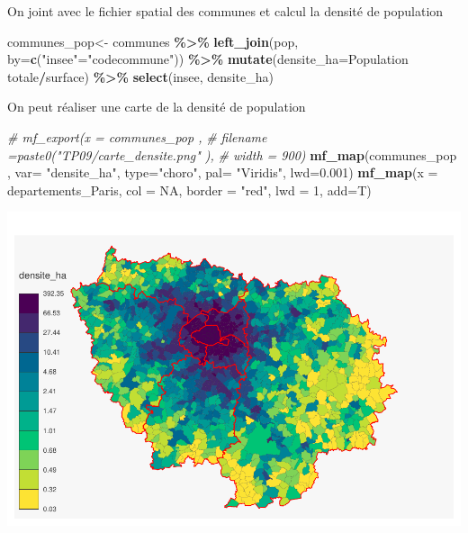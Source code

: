 \documentclass[
]{book}
\newenvironment{Shaded}{\begin{snugshade}}{\end{snugshade}}
\newcommand{\AttributeTok}[1]{\textcolor[rgb]{0.13,0.29,0.53}{#1}}
\newcommand{\CommentTok}[1]{\textcolor[rgb]{0.56,0.35,0.01}{\textit{#1}}}
\newcommand{\ConstantTok}[1]{\textcolor[rgb]{0.56,0.35,0.01}{#1}}
\newcommand{\DecValTok}[1]{\textcolor[rgb]{0.00,0.00,0.81}{#1}}
\newcommand{\FloatTok}[1]{\textcolor[rgb]{0.00,0.00,0.81}{#1}}
\newcommand{\FunctionTok}[1]{\textcolor[rgb]{0.13,0.29,0.53}{\textbf{#1}}}
\newcommand{\NormalTok}[1]{#1}
\newcommand{\OtherTok}[1]{\textcolor[rgb]{0.56,0.35,0.01}{#1}}
\newcommand{\SpecialCharTok}[1]{\textcolor[rgb]{0.81,0.36,0.00}{\textbf{#1}}}
\newcommand{\StringTok}[1]{\textcolor[rgb]{0.31,0.60,0.02}{#1}}
\begin{document}
On joint avec le fichier spatial des communes et calcul la densité de population

\begin{Shaded}
\begin{Highlighting}[]
\NormalTok{communes\_pop}\OtherTok{\textless{}{-}}\NormalTok{ communes }\SpecialCharTok{\%\textgreater{}\%}
  \FunctionTok{left\_join}\NormalTok{(pop, }\AttributeTok{by=}\FunctionTok{c}\NormalTok{(}\StringTok{"insee"}\OtherTok{=}\StringTok{"codecommune"}\NormalTok{)) }\SpecialCharTok{\%\textgreater{}\%}
  \FunctionTok{mutate}\NormalTok{(}\AttributeTok{densite\_ha=}\StringTok{\textasciigrave{}}\AttributeTok{Population totale}\StringTok{\textasciigrave{}}\SpecialCharTok{/}\NormalTok{surface) }\SpecialCharTok{\%\textgreater{}\%}
  \FunctionTok{select}\NormalTok{(insee, densite\_ha)}
\end{Highlighting}
\end{Shaded}

On peut réaliser une carte de la densité de population

\begin{Shaded}
\begin{Highlighting}[]
\CommentTok{\# mf\_export(x = communes\_pop ,}
\CommentTok{\#           filename =paste0("TP09/carte\_densite.png" ),}
\CommentTok{\#           width = 900)}
\FunctionTok{mf\_map}\NormalTok{(communes\_pop ,}
       \AttributeTok{var=} \StringTok{"densite\_ha"}\NormalTok{,}
       \AttributeTok{type=}\StringTok{"choro"}\NormalTok{,}
       \AttributeTok{pal=} \StringTok{"Viridis"}\NormalTok{,}
       \AttributeTok{lwd=}\FloatTok{0.001}\NormalTok{)}
\FunctionTok{mf\_map}\NormalTok{(}\AttributeTok{x =}\NormalTok{ departements\_Paris, }\AttributeTok{col =} \ConstantTok{NA}\NormalTok{, }\AttributeTok{border =} \StringTok{"red"}\NormalTok{, }\AttributeTok{lwd =} \DecValTok{1}\NormalTok{, }\AttributeTok{add=}\NormalTok{T)}
\end{Highlighting}
\end{Shaded}

\includegraphics{bookdown-demo_files/figure-latex/unnamed-chunk-78-1.pdf}
\end{document}
